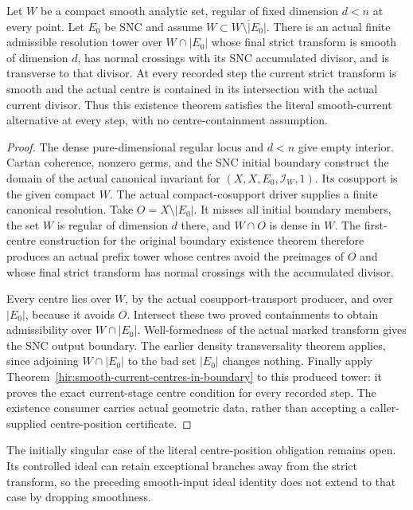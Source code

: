 \begin{theorem}
\label{hir:smooth-boundary-resolution-stage-centres}
\leanok
Let $W$ be a compact smooth analytic set, regular of fixed dimension $d<n$
at every point. Let $E_0$ be SNC and assume $W\subset\overline{W\setminus|E_0|}$.
There is an actual finite admissible resolution tower over $W\cap|E_0|$
whose final strict transform is smooth of dimension $d$, has normal crossings
with its SNC accumulated divisor, and is transverse to that divisor.
At every recorded step the current strict transform is smooth and the
actual centre is contained in its intersection with the actual current
divisor. Thus this existence theorem satisfies the literal smooth-current
alternative at every step, with no centre-containment assumption.
\end{theorem}
\begin{proof}
The dense pure-dimensional regular locus and $d<n$ give empty interior.
Cartan coherence, nonzero germs, and the SNC initial boundary construct
the domain of the actual canonical invariant for
$(X,X,E_0,\mathcal I_W,1)$. Its cosupport is the given compact $W$.
The actual compact-cosupport driver supplies a finite canonical resolution.
Take $O=X\setminus|E_0|$. It misses all initial boundary members, the set
$W$ is regular of dimension $d$ there, and $W\cap O$ is dense in $W$.
The first-centre construction for the original boundary existence theorem
therefore produces an actual prefix tower whose centres avoid the preimages
of $O$ and whose final strict transform has normal crossings with the
accumulated divisor.

Every centre lies over $W$, by the actual cosupport-transport producer,
and over $|E_0|$, because it avoids $O$. Intersect these two proved containments
to obtain admissibility over $W\cap|E_0|$. Well-formedness of the actual
marked transform gives the SNC output boundary. The earlier density
transversality theorem applies, since adjoining $W\cap|E_0|$ to the bad
set $|E_0|$ changes nothing. Finally apply
Theorem~\ref{hir:smooth-current-centres-in-boundary} to this produced tower:
it proves the exact current-stage centre condition for every recorded step.
The existence consumer carries actual geometric data, rather than accepting
a caller-supplied centre-position certificate.
\end{proof}

The initially singular case of the literal centre-position obligation remains
open. Its controlled ideal can retain exceptional branches away from the
strict transform, so the preceding smooth-input ideal identity does not
extend to that case by dropping smoothness.
